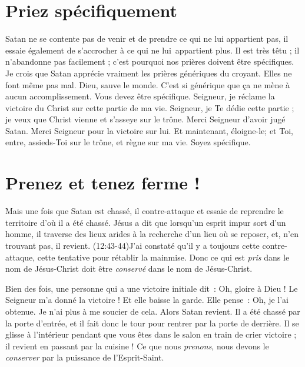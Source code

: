 \section{Priez sp\'ecifiquement}

Satan ne se contente pas de venir et de prendre ce qui ne lui appartient pas,
 il essaie également de s'accrocher à ce qui ne lui~appartient %
 plus.  Il est très têtu ; il n'abandonne pas facilement ;
 c'est pourquoi nos prières doivent être spécifiques.
 Je crois que Satan apprécie vraiment les prières génériques du croyant.
 Elles ne font même pas mal. \og Dieu, sauve le monde. \fg{}
 C'est si générique que ça ne mène à aucun accomplissement.
 Vous devez être spécifique. \og Seigneur, je réclame la victoire du Christ
 sur cette partie de ma vie. Seigneur, je Te dédie cette partie ;
 je veux que Christ vienne et s'asseye sur le trône.
 Merci Seigneur d'avoir jugé Satan.
 Merci Seigneur pour la victoire sur lui.
 Et maintenant, éloigne-le;
 et Toi, entre, assieds-Toi sur le trône,
 et règne sur ma vie. \fg{} Soyez spécifique.


\section{Prenez et tenez ferme !}

Mais une fois que Satan est chassé, il contre-attaque et essaie de reprendre
 le territoire d'où il a été chassé.
 Jésus a dit que lorsqu'un esprit impur sort d'un homme,
 il traverse des lieux arides à la recherche d'un lieu où se reposer,
 et, n'en trouvant pas, il revient.
 (12:43-44)J'ai constaté qu'il y a toujours cette contre-attaque,
 cette tentative pour rétablir la mainmise.
 Donc ce qui est \emph{pris} dans le nom de Jésus-Christ doit être
 \emph{conservé} dans le nom de Jésus-Christ.

Bien des fois, une personne qui a une victoire initiale dit~:
 \og Oh, gloire à Dieu ! Le Seigneur m'a donné la victoire ! \fg{}
 Et elle baisse la garde. Elle pense~: \og Oh, je l'ai obtenue.
 Je n'ai plus à me soucier de cela. \fg{} Alors Satan revient.
 Il a été chassé par la porte d'entrée, et il fait donc le tour
 pour rentrer par la porte de derrière.
 Il se glisse à l'intérieur pendant que vous êtes dans le salon
 en train de crier victoire ; il revient en passant par la cuisine !
 Ce que nous \emph{prenons}, nous devons le \emph{conserver}
 par la puissance de l'Esprit-Saint.
\closechapter


